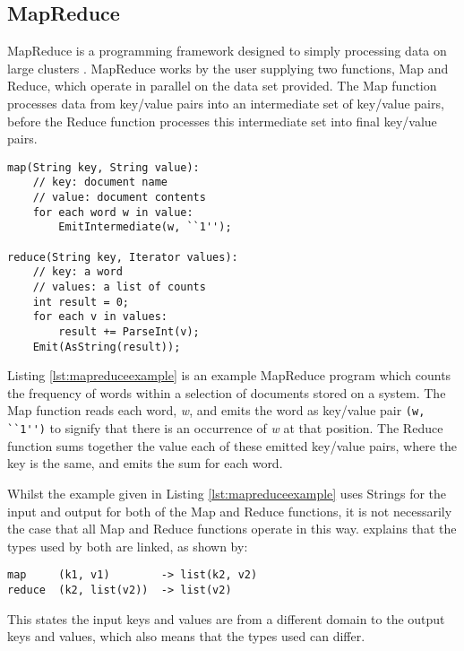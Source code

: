 \subsection{MapReduce}
MapReduce is a programming framework designed to simply processing data on large clusters \cite{mapreduce}. MapReduce works by the user supplying two functions, Map and Reduce, which operate in parallel on the data set provided. The Map function processes data from key/value pairs into an intermediate set of key/value pairs, before the Reduce function processes this intermediate set into final key/value pairs.

\begin{lstlisting}[float]
map(String key, String value):
	// key: document name
	// value: document contents
	for each word w in value:
		EmitIntermediate(w, ``1'');
		
reduce(String key, Iterator values):
	// key: a word
	// values: a list of counts
	int result = 0;
	for each v in values:
		result += ParseInt(v);
	Emit(AsString(result));	
\end{lstlisting}

Listing \ref{lst:mapreduceexample} is an example MapReduce program which counts the frequency of words within a selection of documents stored on a system. The Map function reads each word, \emph{w}, and emits the word as key/value pair \verb/(w, ``1'')/ to signify that there is an occurrence of \emph{w} at that position. The Reduce function sums together the value each of these emitted key/value pairs, where the key is the same, and emits the sum for each word.

Whilst the example given in Listing \ref{lst:mapreduceexample} uses Strings for the input and output for both of the Map and Reduce functions, it is not necessarily the case that all Map and Reduce functions operate in this way. \cite{mapreduce} explains that the types used by both are linked, as shown by:

\begin{verbatim}
map     (k1, v1)        -> list(k2, v2)
reduce  (k2, list(v2))  -> list(v2)
\end{verbatim}

This states the input keys and values are from a different domain to the output keys and values, which also means that the types used can differ.

